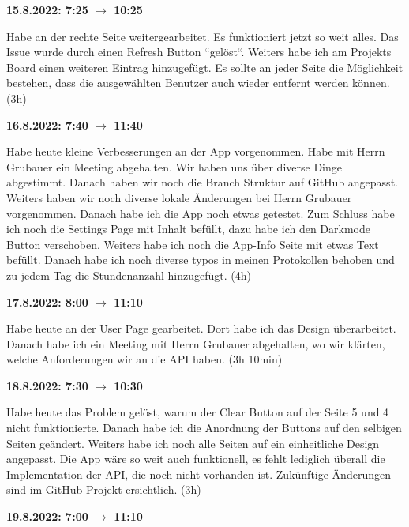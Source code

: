 \vspace{0.5cm}

\textbf{15.8.2022: 7:25 $\rightarrow$ 10:25} \

Habe an der rechte Seite weitergearbeitet. Es funktioniert jetzt so weit alles. Das Issue wurde durch einen Refresh Button ``gelöst``. Weiters habe ich am Projekts Board einen weiteren Eintrag hinzugefügt. Es sollte an jeder Seite die Möglichkeit bestehen, dass die ausgewählten Benutzer auch wieder entfernt werden können. (3h)

\vspace{0.5cm}

\textbf{16.8.2022: 7:40 $\rightarrow$ 11:40} \

Habe heute kleine Verbesserungen an der App vorgenommen. Habe mit Herrn Grubauer ein Meeting abgehalten. Wir haben uns über diverse Dinge abgestimmt. Danach haben wir noch die Branch Struktur auf GitHub angepasst. Weiters haben wir noch diverse lokale Änderungen bei Herrn Grubauer vorgenommen. Danach habe ich die App noch etwas getestet. Zum Schluss habe ich noch die Settings Page mit Inhalt befüllt, dazu habe ich den Darkmode Button verschoben. Weiters habe ich noch die App-Info Seite mit etwas Text befüllt. Danach habe ich noch diverse typos in meinen Protokollen behoben und zu jedem Tag die Stundenanzahl hinzugefügt. (4h)

\vspace{0.5cm}

\textbf{17.8.2022: 8:00 $\rightarrow$ 11:10} \

Habe heute an der User Page gearbeitet. Dort habe ich das Design überarbeitet. Danach habe ich ein Meeting mit Herrn Grubauer abgehalten, wo wir klärten,
welche Anforderungen wir an die API haben. (3h 10min)

\vspace{0.5cm}

\textbf{18.8.2022: 7:30 $\rightarrow$ 10:30} \

Habe heute das Problem gelöst, warum der Clear Button auf der Seite 5 und 4 nicht funktionierte. Danach habe ich die Anordnung der Buttons auf den selbigen Seiten geändert. Weiters habe ich noch alle Seiten auf ein einheitliche Design angepasst. Die App wäre so weit auch funktionell, es fehlt lediglich überall die Implementation der API, die noch nicht vorhanden ist. Zukünftige Änderungen sind im GitHub Projekt ersichtlich. (3h)

\vspace{0.5cm}

\textbf{19.8.2022: 7:00 $\rightarrow$ 11:10} \

